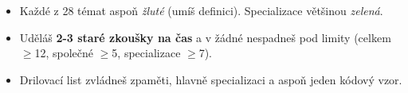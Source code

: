 \begin{infobox}[title={Kontrola před zkouškou}]
\begin{itemize}[leftmargin=1.2em]
  \item Každé z 28 témat aspoň \emph{žluté} (umíš definici). Specializace většinou \emph{zelená}.
  \item Uděláš \textbf{2-3 staré zkoušky na čas} a v žádné nespadneš pod limity
  (celkem $\ge$12, společné $\ge$5, specializace $\ge$7).
  \item Drilovací list zvládneš zpaměti, hlavně specializaci a aspoň jeden kódový vzor.
\end{itemize}
\end{infobox}
